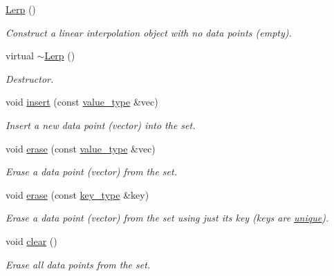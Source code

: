 \begin{DoxyCompactItemize}
\item 
\hyperlink{classmetrobotics_1_1Lerp_abb7f68c0aff8edfc1c40687106b6e6e4}{\-Lerp} ()
\begin{DoxyCompactList}\small\item\em \-Construct a linear interpolation object with no data points (empty). \end{DoxyCompactList}\item 
virtual \hyperlink{classmetrobotics_1_1Lerp_a84387168d70142028c4325f75fd272ab}{$\sim$\-Lerp} ()
\begin{DoxyCompactList}\small\item\em \-Destructor. \end{DoxyCompactList}\item 
void \hyperlink{classmetrobotics_1_1Lerp_a2b4ba90b90cf116b266d2e719b9804b2}{insert} (const \hyperlink{classmetrobotics_1_1Lerp_ab1be5a6a96856f10c5eadc416d630a40}{value\-\_\-type} \&vec)
\begin{DoxyCompactList}\small\item\em \-Insert a new data point (vector) into the set. \end{DoxyCompactList}\item 
void \hyperlink{classmetrobotics_1_1Lerp_ade85e0e6f1cdcc1075d6faf601293963}{erase} (const \hyperlink{classmetrobotics_1_1Lerp_ab1be5a6a96856f10c5eadc416d630a40}{value\-\_\-type} \&vec)
\begin{DoxyCompactList}\small\item\em \-Erase a data point (vector) from the set. \end{DoxyCompactList}\item 
void \hyperlink{classmetrobotics_1_1Lerp_a432a3ee5f26285d491f002f060d3c851}{erase} (const \hyperlink{classmetrobotics_1_1Lerp_a3cd6f9215623083b5ed90f4c03ac6dc7}{key\-\_\-type} \&key)
\begin{DoxyCompactList}\small\item\em \-Erase a data point (vector) from the set using just its key (keys are \hyperlink{classmetrobotics_1_1Lerp_unique}{unique}). \end{DoxyCompactList}\item 
void \hyperlink{classmetrobotics_1_1Lerp_af8b4b0527081cba4657b35d697cab1af}{clear} ()
\begin{DoxyCompactList}\small\item\em \-Erase all data points from the set. \end{DoxyCompactList}\item 

\end{DoxyCompactItemize}

